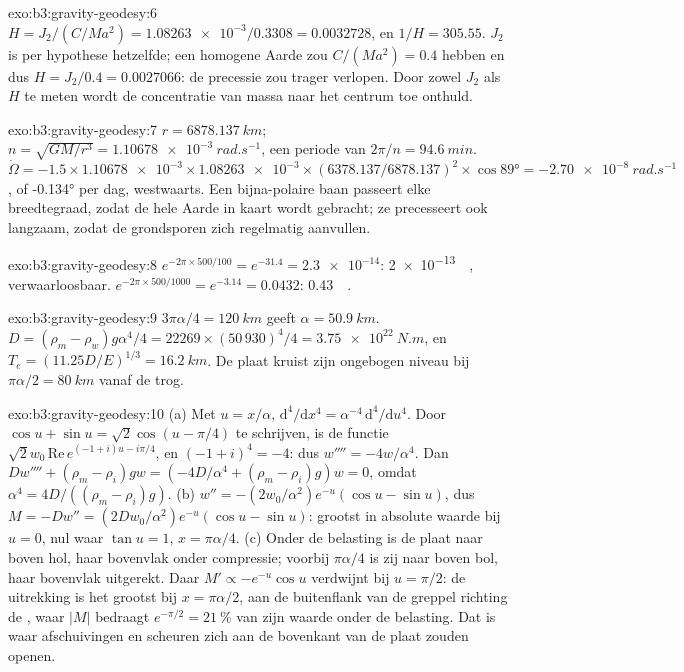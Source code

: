\begin{solution}{exo:b3:gravity-geodesy:6}
$H = J_2/(C/Ma^2) = \num{1.08263e-3}/0.3308 = \num{0.0032728}$, en
$1/H = 305.55$. $J_2$ is per hypothese hetzelfde; een homogene Aarde zou
$C/(Ma^2) = 0.4$ hebben en dus $H = J_2/0.4 = \num{0.0027066}$: de precessie zou
trager verlopen. Door zowel $J_2$ als $H$ te meten wordt de concentratie van massa
naar het centrum toe onthuld.
\end{solution}

\begin{solution}{exo:b3:gravity-geodesy:7}
$r = \qty{6878.137}{km}$; $n = \sqrt{GM/r^3} = \qty{1.10678e-3}{rad.s^{-1}}$, een
periode van $2\pi/n = \qty{94.6}{min}$. $\dot\Omega = -1.5\times\num{1.10678e-3}
\times\num{1.08263e-3}\times(6378.137/6878.137)^2\times\cos\ang{89} =
\qty{-2.70e-8}{rad.s^{-1}}$, of \ang{-0.134} per dag, westwaarts. Een bijna-polaire baan
passeert elke breedtegraad, zodat de hele Aarde in kaart wordt gebracht; ze precesseert ook
langzaam, zodat de grondsporen zich regelmatig aanvullen.
\end{solution}

\begin{solution}{exo:b3:gravity-geodesy:8}
$e^{-2\pi\times500/100} = e^{-31.4} = \num{2.3e-14}$: \qty{2e-13}{\milli\gal},
verwaarloosbaar. $e^{-2\pi\times500/1000} = e^{-3.14} = 0.0432$:
\qty{0.43}{\milli\gal}.
\end{solution}

\begin{solution}{exo:b3:gravity-geodesy:9}
$3\pi\alpha/4 = \qty{120}{km}$ geeft $\alpha = \qty{50.9}{km}$.
$D = (\rho_m - \rho_w)g\alpha^4/4 = 22269\times(50\,930)^4/4 =
\qty{3.75e22}{N.m}$, en $T_e = (11.25D/E)^{1/3} = \qty{16.2}{km}$. De plaat
kruist zijn ongebogen niveau bij $\pi\alpha/2 = \qty{80}{km}$ vanaf de trog.
\end{solution}

\begin{solution}{exo:b3:gravity-geodesy:10}
(a) Met $u = x/\alpha$, $\mathrm d^4/\mathrm dx^4 = \alpha^{-4}\,\mathrm
d^4/\mathrm du^4$. Door $\cos u + \sin u = \sqrt2\cos(u - \pi/4)$ te schrijven, is de
functie $\sqrt2w_0\,\mathrm{Re}\,e^{(-1 + i)u - i\pi/4}$, en
$(-1 + i)^4 = -4$: dus $w'''' = -4w/\alpha^4$. Dan $Dw'''' + (\rho_m -
\rho_i)gw = (-4D/\alpha^4 + (\rho_m - \rho_i)g)w = 0$, omdat $\alpha^4 =
4D/((\rho_m - \rho_i)g)$. (b) $w'' = -(2w_0/\alpha^2)e^{-u}(\cos u - \sin u)$, dus
$M = -Dw'' = (2Dw_0/\alpha^2)e^{-u}(\cos u - \sin u)$: grootst in absolute waarde bij
$u = 0$, nul waar $\tan u = 1$, $x = \pi\alpha/4$. (c) Onder de belasting is de
plaat naar boven hol, haar bovenvlak onder compressie; voorbij $\pi\alpha/4$
is zij naar boven bol, haar bovenvlak uitgerekt. Daar $M' \propto
-e^{-u}\cos u$ verdwijnt bij $u = \pi/2$: de uitrekking is het grootst bij
$x = \pi\alpha/2$, aan de buitenflank van de greppel richting de , waar
$|M|$ bedraagt $e^{-\pi/2} = \qty{21}{\percent}$ van zijn waarde onder de belasting. Dat is
waar afschuivingen en scheuren zich aan de bovenkant van de plaat zouden openen.
\end{solution}

